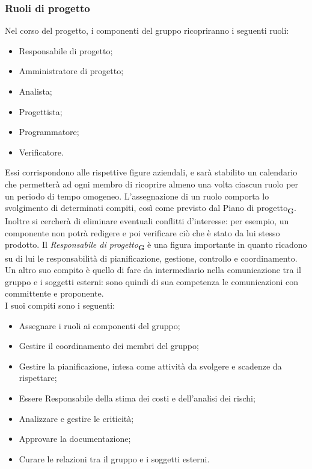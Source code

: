 \subsubsection{Ruoli di progetto}
Nel corso del progetto, i componenti del gruppo ricopriranno i seguenti ruoli:
\begin {itemize}
\item Responsabile di progetto;
\item Amministratore di progetto;
\item Analista;
\item Progettista;
\item Programmatore;
\item Verificatore.
\end {itemize}
Essi corrispondono alle rispettive figure aziendali, e sarà stabilito un calendario che permetterà ad ogni membro di ricoprire almeno una volta ciascun ruolo per un periodo di tempo omogeneo. L’assegnazione di un ruolo comporta lo svolgimento di determinati compiti, così come previsto dal Piano di progetto\textsubscript{\textbf{G}}. Inoltre si cercherà di eliminare eventuali conflitti d'interesse: per esempio, un componente non potrà redigere e poi verificare ciò che è stato da lui stesso prodotto.
Il \textit{Responsabile di progetto}\textsubscript{\textbf{G}} è una figura importante in quanto ricadono su di lui le responsabilità di pianificazione, gestione, controllo e coordinamento. Un altro suo compito è quello di fare da intermediario nella comunicazione tra il gruppo e i soggetti esterni: sono quindi di sua competenza le comunicazioni con committente e proponente.\\
I suoi compiti sono i seguenti:
\begin {itemize}
\item Assegnare i ruoli ai componenti del gruppo;
\item Gestire il coordinamento dei membri del gruppo;
\item Gestire la pianificazione, intesa come attività da svolgere e scadenze da rispettare;
\item Essere Responsabile della stima dei costi e dell’analisi dei rischi;
\item Analizzare e gestire le criticità;
\item Approvare la documentazione;
\item Curare le relazioni tra il gruppo e i soggetti esterni.
\end {itemize}
